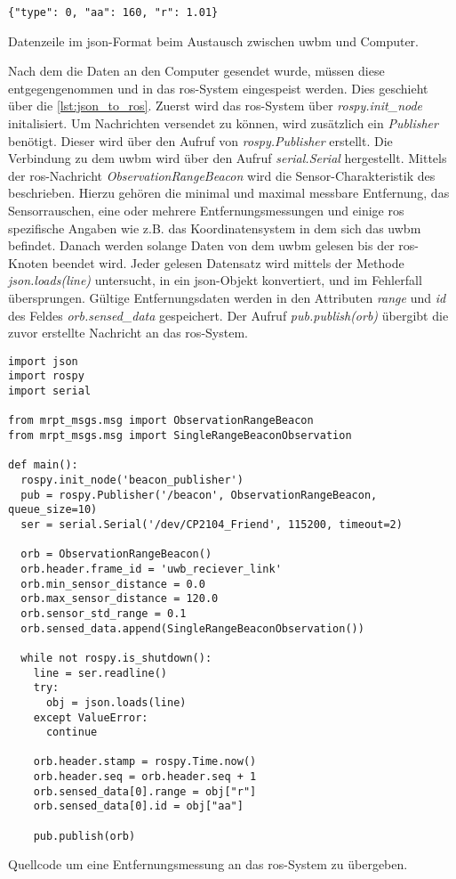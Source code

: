 \begin{listing}
	\begin{verbatim}
{"type": 0, "aa": 160, "r": 1.01}
	\end{verbatim}
	\unskip
	\caption{Datenzeile im \Gls{json}-Format beim Austausch zwischen \Gls{uwbm} und Computer.}
	\label{lst:data_in_json_format}
\end{listing}

Nach dem die Daten an den Computer gesendet wurde, müssen diese entgegengenommen und in das \Gls{ros}-System eingespeist werden. Dies geschieht über die \autoref{lst:json_to_ros}.
Zuerst wird das \Gls{ros}-System über \textit{rospy.init\_node} initalisiert. Um Nachrichten versendet zu können, wird zusätzlich ein \textit{Publisher} benötigt. Dieser wird über den Aufruf von \textit{rospy.Publisher} erstellt. Die Verbindung zu dem \Gls{uwbm} wird über den Aufruf \textit{serial.Serial} hergestellt.
Mittels der \Gls{ros}-Nachricht \textit{ObservationRangeBeacon} wird die Sensor-Charakteristik des  beschrieben. Hierzu gehören die minimal und maximal messbare Entfernung, das Sensorrauschen, eine oder mehrere Entfernungsmessungen und einige \Gls{ros} spezifische Angaben wie z.B. das Koordinatensystem in dem sich das \Gls{uwbm} befindet.
Danach werden solange Daten von dem \Gls{uwbm} gelesen bis der \Gls{ros}-Knoten beendet wird. Jeder gelesen Datensatz wird mittels der Methode \textit{json.loads(line)} untersucht, in ein \Gls{json}-Objekt konvertiert, und im Fehlerfall übersprungen. Gültige Entfernungsdaten werden in den Attributen \textit{range} und \textit{id} des Feldes \textit{orb.sensed\_data} gespeichert.
Der Aufruf \textit{pub.publish(orb)} übergibt die zuvor erstellte Nachricht an das \Gls{ros}-System.

\begin{listing}
	\begin{verbatim}
import json
import rospy
import serial

from mrpt_msgs.msg import ObservationRangeBeacon
from mrpt_msgs.msg import SingleRangeBeaconObservation

def main():
  rospy.init_node('beacon_publisher')
  pub = rospy.Publisher('/beacon', ObservationRangeBeacon, queue_size=10)
  ser = serial.Serial('/dev/CP2104_Friend', 115200, timeout=2)

  orb = ObservationRangeBeacon()
  orb.header.frame_id = 'uwb_reciever_link'
  orb.min_sensor_distance = 0.0
  orb.max_sensor_distance = 120.0
  orb.sensor_std_range = 0.1
  orb.sensed_data.append(SingleRangeBeaconObservation())

  while not rospy.is_shutdown():
    line = ser.readline()
    try:
      obj = json.loads(line)
    except ValueError:
      continue

    orb.header.stamp = rospy.Time.now()
    orb.header.seq = orb.header.seq + 1
    orb.sensed_data[0].range = obj["r"]
    orb.sensed_data[0].id = obj["aa"]

    pub.publish(orb)
	\end{verbatim}
	\unskip
	\caption{Quellcode um eine Entfernungsmessung an das \Gls{ros}-System zu übergeben.}
	\label{lst:json_to_ros}
\end{listing}

